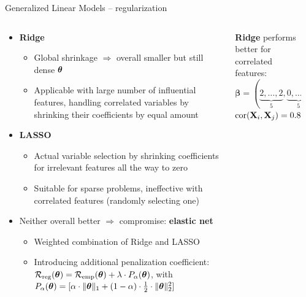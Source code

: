 \begin{frame}{Generalized Linear Models -- regularization}

  \begin{columns}[T, totalwidth=\textwidth]
  \begin{column}{0.62\textwidth}


\begin{itemize}
  \item \textbf{Ridge}
  \begin{itemize} 
    \item Global shrinkage $\Rightarrow$ overall smaller but still dense $\bm{\theta}$
    \item Applicable with large number of influential features, handling 
    correlated variables by shrinking their coefficients by equal amount
  \end{itemize}
  \item \textbf{LASSO}
  \begin{itemize} 
    \item Actual variable selection by shrinking coefficients for irrelevant 
    features all the way to zero
    \item Suitable for sparse problems, ineffective with correlated 
    features (randomly selecting one)
  \end{itemize}  
  \item Neither overall better $\Rightarrow$ compromise: \textbf{elastic net}
  \begin{itemize} 
    \item Weighted combination of Ridge and LASSO
    \item Introducing additional penalization coefficient: %
    $\mathcal{R}_{\text{reg}}(\bm{\theta}) = \mathcal{R}_{\text{emp}}(\bm{\theta}) 
    + \lambda \cdot P_{\alpha}(\bm{\theta})$, with\\
    $P_{\alpha}(\bm{\theta}) = [\alpha \cdot \|\bm{\theta}\|_1 + (1 - \alpha) \cdot \frac{1}{2} \cdot \|\bm{\theta}\|_2^2]$
  \end{itemize}  
\end{itemize}

\end{column}

\begin{column}{0.38\textwidth}
\tiny
\centering
\begin{columns}[T, totalwidth=\textwidth]
\begin{column}{0.5\textwidth}
\tiny
\begin{center}
\textbf{Ridge} performs better for correlated features: \\ 
\medskip
$\boldsymbol{\beta}=(\underbrace{2,\ldots,2}_{5},\underbrace{0,\ldots,0}_{5})$\\
$ \operatorname{cor}(\mathbf{X}_{i},\mathbf{X}_{j})=0.8^{|i-j|}, \forall i, j$
  \end{center}
\end{column}
\begin{column}{0.5\textwidth} \tiny


\end{column}
\end{columns}
\end{column}
\end{columns}
\end{frame}
